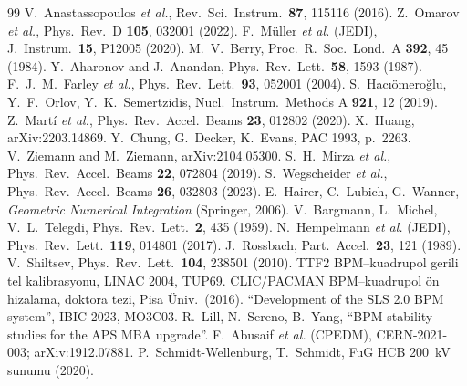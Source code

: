 \documentclass[12pt,a4paper]{extarticle}
\begin{document}
\begin{thebibliography}{99}\small
{} V.~Anastassopoulos \emph{et al.}, Rev.\ Sci.\ Instrum.\ \textbf{87}, 115116 (2016).
 Z.~Omarov \emph{et al.}, Phys.\ Rev.\ D \textbf{105}, 032001 (2022).
 F.~Müller \emph{et al.} (JEDI), J.\ Instrum.\ \textbf{15}, P12005 (2020).
 M.~V.~Berry, Proc.\ R.\ Soc.\ Lond.\ A \textbf{392}, 45 (1984).
 Y.~Aharonov and J.~Anandan, Phys.\ Rev.\ Lett.\ \textbf{58}, 1593 (1987).
 F.~J.~M.~Farley \emph{et al.}, Phys.\ Rev.\ Lett.\ \textbf{93}, 052001 (2004).
 S.~Hacıömeroğlu, Y.~F.~Orlov, Y.~K.~Semertzidis, Nucl.\ Instrum.\ Methods A
\textbf{921}, 12 (2019).
 Z.~Martí \emph{et al.}, Phys.\ Rev.\ Accel.\ Beams \textbf{23}, 012802 (2020).
 X.~Huang, arXiv:2203.14869.
 Y.~Chung, G.~Decker, K.~Evans, PAC 1993, p.~2263.
 V.~Ziemann and M.~Ziemann, arXiv:2104.05300.
 S.~H.~Mirza \emph{et al.}, Phys.\ Rev.\ Accel.\ Beams \textbf{22}, 072804 (2019).
 S.~Wegscheider \emph{et al.}, Phys.\ Rev.\ Accel.\ Beams \textbf{26}, 032803 (2023).
 E.~Hairer, C.~Lubich, G.~Wanner, \emph{Geometric Numerical Integration} (Springer, 2006).
 V.~Bargmann, L.~Michel, V.~L.~Telegdi, Phys.\ Rev.\ Lett.\ \textbf{2}, 435 (1959).
 N.~Hempelmann \emph{et al.} (JEDI), Phys.\ Rev.\ Lett.\ \textbf{119}, 014801 (2017).
 J.~Rossbach, Part.\ Accel.\ \textbf{23}, 121 (1989).
 V.~Shiltsev, Phys.\ Rev.\ Lett.\ \textbf{104}, 238501 (2010).
 TTF2 BPM--kuadrupol gerili tel kalibrasyonu, LINAC 2004, TUP69.
 CLIC/PACMAN BPM--kuadrupol ön hizalama, doktora tezi, Pisa Üniv.\ (2016).
 ``Development of the SLS 2.0 BPM system'', IBIC 2023, MO3C03.
 R.~Lill, N.~Sereno, B.~Yang, ``BPM stability studies for the APS MBA upgrade''.
 F.~Abusaif \emph{et al.} (CPEDM), CERN-2021-003; arXiv:1912.07881.
 P.~Schmidt-Wellenburg, T.~Schmidt, FuG HCB 200~kV sunumu (2020).
\end{thebibliography}
\end{document}
